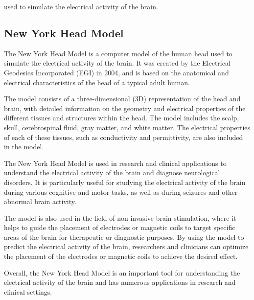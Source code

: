 \documentclass[a4paper, UKenglish, 11pt]{uiomaster}
\begin{document}

used to simulate the electrical activity of the brain.

\subsection{}





\subsection{New York Head Model}
The New York Head Model is a computer model of the human head used to simulate the electrical activity of the brain. It was created by the Electrical Geodesics Incorporated (EGI) in 2004, and is based on the anatomical and electrical characteristics of the head of a typical adult human.

The model consists of a three-dimensional (3D) representation of the head and brain, with detailed information on the geometry and electrical properties of the different tissues and structures within the head. The model includes the scalp, skull, cerebrospinal fluid, gray matter, and white matter. The electrical properties of each of these tissues, such as conductivity and permittivity, are also included in the model.

The New York Head Model is used in research and clinical applications to understand the electrical activity of the brain and diagnose neurological disorders. It is particularly useful for studying the electrical activity of the brain during various cognitive and motor tasks, as well as during seizures and other abnormal brain activity.

The model is also used in the field of non-invasive brain stimulation, where it helps to guide the placement of electrodes or magnetic coils to target specific areas of the brain for therapeutic or diagnostic purposes. By using the model to predict the electrical activity of the brain, researchers and clinicians can optimize the placement of the electrodes or magnetic coils to achieve the desired effect.

Overall, the New York Head Model is an important tool for understanding the electrical activity of the brain and has numerous applications in research and clinical settings.
\end{document}
